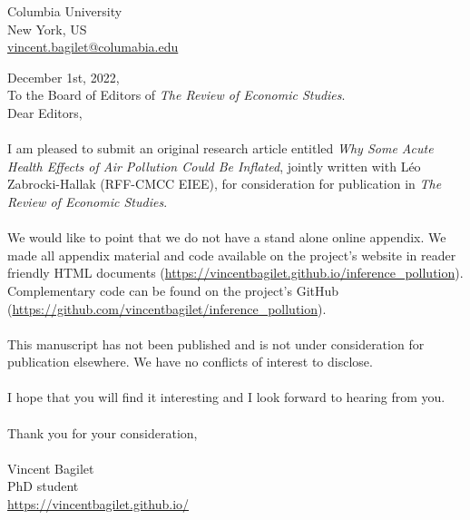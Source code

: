 \documentclass[11pt]{article}
\begin{document}

\begin{flushright}
Columbia University \\
New York, US \\
\url{vincent.bagilet@columabia.edu}
\end{flushright}

December 1st, 2022, \\

To the Board of Editors of \textit{The Review of Economic Studies}. \\

Dear Editors,
\\
\\
I am pleased to submit an original research article entitled \textit{Why Some Acute Health Effects of Air Pollution Could Be Inflated}, jointly written with Léo Zabrocki-Hallak (RFF-CMCC EIEE), for consideration for publication in \textit{The Review of Economic Studies}.
\\
\\
We would like to point that we do not have a stand alone online appendix. We made all appendix material and code available on the project's website in reader friendly HTML documents (\url{https://vincentbagilet.github.io/inference_pollution}). Complementary code can be found on the project's GitHub (\url{https://github.com/vincentbagilet/inference_pollution}).
\\
\\
This manuscript has not been published and is not under consideration for publication elsewhere. We have no conflicts of interest to disclose.
\\
\\
I hope that you will find it interesting and I look forward to hearing from you.
\\
\\
Thank you for your consideration,
\\
\\
Vincent Bagilet \\
PhD student\\
\url{https://vincentbagilet.github.io/}
\end{document}
